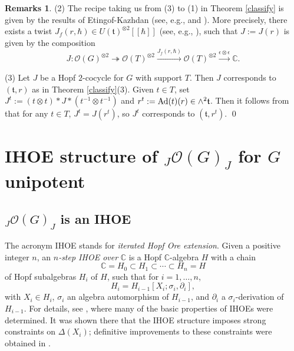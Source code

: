 \documentclass{amsart}
\numberwithin{equation}{section}
\theoremstyle{definition}
\newtheorem{remarks}[theorem]{Remarks}
\newcommand{\ot}{\otimes}
\begin{document}
\begin{remarks}
(2) The recipe taking us from (3) to (1) in Theorem \ref{classify} is given by the results of Etingof-Kazhdan \cite{EK} (see, e.g., \cite[Example 5.3, Theorem 5.3]{EG1} and \cite[\S 3.1]{EG6}). More precisely, there exists a twist $J_f(r,\hbar)\in U(\mathfrak{t})^{\otimes 2}[[\hbar ]]$ (see, e.g., \cite[Eq. (10)]{EG1}), such that $J:=J(r)$ is given by the composition
\begin{equation}\label{univforJ}
J:\mathcal{O}(G)^{\otimes 2}\twoheadrightarrow \mathcal{O}(T)^{\otimes 2}\xrightarrow{J_f(r,\hbar)}\mathcal{O}(T)^{\otimes 2}\xrightarrow{\epsilon\otimes \epsilon}\mathbb{C}.
\end{equation}

(3) Let $J$ be a Hopf $2$-cocycle for $G$ with support $T$. Then $J$ corresponds to $(\mathfrak{t},r)$ as in Theorem \ref{classify}(3). Given $t\in T$, set $J^t:=(t\ot t)*J*(t^{-1}\ot t^{-1})$ and $r^t:={\rm Ad}(t)(r)\in\wedge^2\mathfrak{t}$. Then it follows from \cite[Eq. (10)]{EG1} that for any $t\in T$, $J^t=J(r^t)$, so $J^t$ corresponds to $(\mathfrak{t},r^t)$. \qed 
\end{remarks}

\section{IHOE structure of $_J\mathcal{O}(G)_J$ for $G$ unipotent}\label{IHOEand}

\subsection{${}_J\mathcal{O}(G)_J$ is an IHOE}\label{IHOE}

The acronym IHOE stands for \emph{iterated Hopf Ore extension}. Given a positive integer $n$, an \emph{$n$-step IHOE over} $\mathbb{C}$ is a Hopf $\mathbb{C}$-algebra $H$ with a chain
\begin{equation}\label{IHOEchain} \mathbb{C} = H_0 \subset H_1 \subset \cdots \subset H_n = H 
\end{equation}
of Hopf subalgebras $H_i$ of $H$, such that for $i = 1, \ldots , n$, 
\begin{equation}\label{extend}H_i= H_{i-1}[X_i; \sigma_i, \partial_i],
\end{equation} 
with $X_i \in H_i$, $\sigma_i$ an algebra automorphism of $H_{i-1}$, and $\partial_i$ a $\sigma_i$-derivation of $H_{i-1}$. For details, see \cite{BOZZ}, where many of the basic properties of IHOEs were determined. It was shown there that the IHOE structure imposes strong constraints on $\Delta(X_i)$; definitive improvements to these constraints were obtained in \cite{H}. 
\end{document}

